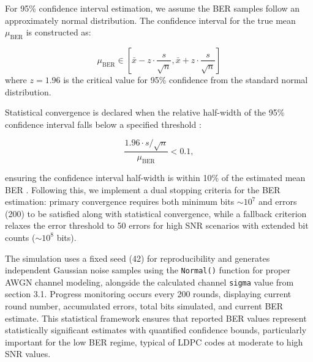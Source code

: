\documentclass[12pt]{scrreprt}
\begin{document}
		For 95\% confidence interval estimation, we assume the BER samples follow an approximately normal distribution. The confidence interval for the true mean $\mu_{\text{BER}}$ is constructed as:
		
		\[ \mu_{\text{BER}} \in \left[ \bar{x} - z \cdot \frac{s}{\sqrt{n}}, \bar{x} + z \cdot \frac{s}{\sqrt{n}} \right] \]
		where $z = 1.96$ is the critical value for 95\% confidence from the standard normal distribution.
		
		Statistical convergence is declared when the relative half-width of the 95\% confidence interval falls below a specified threshold \cite{stats, yt-video}: 
		
		\[ \frac{1.96 \cdot s/\sqrt{n}}{\mu_{\text{BER}}} < 0.1, \] 
		
		ensuring the confidence interval half-width is within 10\% of the estimated mean BER \cite{yt-video, stats}. Following this, we implement a dual stopping criteria for the BER estimation: primary convergence requires both minimum bits $\sim 10^7$ and errors (200) to be satisfied along with statistical convergence, while a fallback criterion relaxes the error threshold to 50 errors for high SNR scenarios with extended bit counts ($\sim 10^8$ bits).
		
		The simulation uses a fixed seed (42) for reproducibility and generates independent Gaussian noise samples using the \verb|Normal()| function for proper AWGN channel modeling, alongside the calculated channel \verb|sigma| value from section 3.1. Progress monitoring occurs every 200 rounds, displaying current round number, accumulated errors, total bits simulated, and current BER estimate. This statistical framework ensures that reported BER values represent statistically significant estimates with quantified confidence bounds, particularly important for the low BER regime, typical of LDPC codes at moderate to high SNR values.
	
\end{document}
